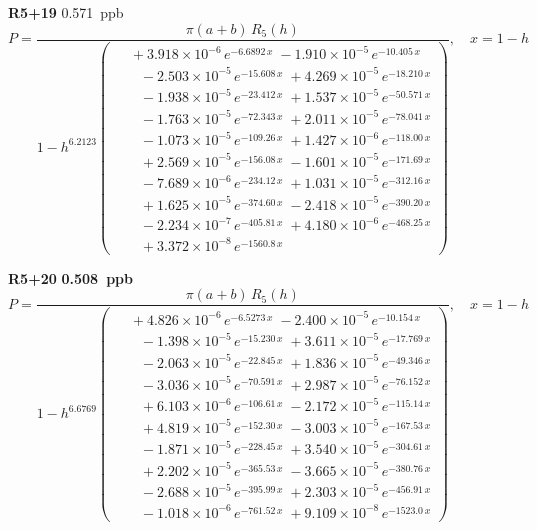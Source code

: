 \documentclass[12pt]{article}
\begin{document}
\noindent\textbf{R5+19} 0.571~ppb\nopagebreak
\begin{equation*}
P = \frac{\pi(a{+}b)\,R_5(h)}{1 - h^{6.2123}\!\left(\!\begin{aligned}
  &\; +3.918{\times}10^{-6}\,e^{-6.6892\,x} \; -1.910{\times}10^{-5}\,e^{-10.405\,x} \\[-3pt]
  &\quad -2.503{\times}10^{-5}\,e^{-15.608\,x} \; +4.269{\times}10^{-5}\,e^{-18.210\,x} \\[-3pt]
  &\quad -1.938{\times}10^{-5}\,e^{-23.412\,x} \; +1.537{\times}10^{-5}\,e^{-50.571\,x} \\[-3pt]
  &\quad -1.763{\times}10^{-5}\,e^{-72.343\,x} \; +2.011{\times}10^{-5}\,e^{-78.041\,x} \\[-3pt]
  &\quad -1.073{\times}10^{-5}\,e^{-109.26\,x} \; +1.427{\times}10^{-6}\,e^{-118.00\,x} \\[-3pt]
  &\quad +2.569{\times}10^{-5}\,e^{-156.08\,x} \; -1.601{\times}10^{-5}\,e^{-171.69\,x} \\[-3pt]
  &\quad -7.689{\times}10^{-6}\,e^{-234.12\,x} \; +1.031{\times}10^{-5}\,e^{-312.16\,x} \\[-3pt]
  &\quad +1.625{\times}10^{-5}\,e^{-374.60\,x} \; -2.418{\times}10^{-5}\,e^{-390.20\,x} \\[-3pt]
  &\quad -2.234{\times}10^{-7}\,e^{-405.81\,x} \; +4.180{\times}10^{-6}\,e^{-468.25\,x} \\[-3pt]
  &\quad +3.372{\times}10^{-8}\,e^{-1560.8\,x}
\end{aligned}\!\right)}, \quad x = 1{-}h
\end{equation*}

\noindent\textbf{R5+20} \textbf{0.508~ppb}\nopagebreak
\begin{equation*}
P = \frac{\pi(a{+}b)\,R_5(h)}{1 - h^{6.6769}\!\left(\!\begin{aligned}
  &\; +4.826{\times}10^{-6}\,e^{-6.5273\,x} \; -2.400{\times}10^{-5}\,e^{-10.154\,x} \\[-3pt]
  &\quad -1.398{\times}10^{-5}\,e^{-15.230\,x} \; +3.611{\times}10^{-5}\,e^{-17.769\,x} \\[-3pt]
  &\quad -2.063{\times}10^{-5}\,e^{-22.845\,x} \; +1.836{\times}10^{-5}\,e^{-49.346\,x} \\[-3pt]
  &\quad -3.036{\times}10^{-5}\,e^{-70.591\,x} \; +2.987{\times}10^{-5}\,e^{-76.152\,x} \\[-3pt]
  &\quad +6.103{\times}10^{-6}\,e^{-106.61\,x} \; -2.172{\times}10^{-5}\,e^{-115.14\,x} \\[-3pt]
  &\quad +4.819{\times}10^{-5}\,e^{-152.30\,x} \; -3.003{\times}10^{-5}\,e^{-167.53\,x} \\[-3pt]
  &\quad -1.871{\times}10^{-5}\,e^{-228.45\,x} \; +3.540{\times}10^{-5}\,e^{-304.61\,x} \\[-3pt]
  &\quad +2.202{\times}10^{-5}\,e^{-365.53\,x} \; -3.665{\times}10^{-5}\,e^{-380.76\,x} \\[-3pt]
  &\quad -2.688{\times}10^{-5}\,e^{-395.99\,x} \; +2.303{\times}10^{-5}\,e^{-456.91\,x} \\[-3pt]
  &\quad -1.018{\times}10^{-6}\,e^{-761.52\,x} \; +9.109{\times}10^{-8}\,e^{-1523.0\,x}
\end{aligned}\!\right)}, \quad x = 1{-}h
\end{equation*}
\end{document}
